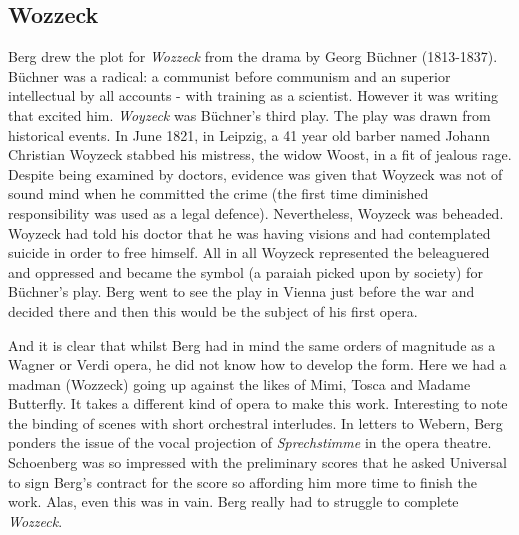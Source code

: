\subsection{Wozzeck}
Berg drew the plot for \textit{Wozzeck} from the drama by Georg B\"uchner (1813-1837). B\"uchner was a radical: a communist before communism and an superior intellectual by all accounts - with training as a scientist. However it was writing that excited him. \textit{Woyzeck} was B\"uchner's third play. The play was drawn from historical events. In June 1821, in Leipzig, a 41 year old barber named Johann Christian Woyzeck stabbed his mistress, the widow Woost, in a fit of jealous rage. Despite being examined by doctors, evidence was given that Woyzeck was not of sound mind when he committed the crime (the first time diminished responsibility was used as a legal defence). Nevertheless, Woyzeck was beheaded. Woyzeck had told his doctor that he was having visions and had contemplated suicide in order to free himself. All in all Woyzeck represented the beleaguered and oppressed and became the symbol (a paraiah picked upon by society) for B\"uchner's play. Berg went to see the play in Vienna just before the war and decided there and then this would be the subject of his first opera.

And it is clear that whilst Berg had in mind the same orders of magnitude as a Wagner or Verdi opera, he did not know how to develop the form. Here we had a madman (Wozzeck) going up against the likes of Mimi, Tosca and Madame Butterfly. It takes a different kind of opera to make this work. Interesting to note the binding of scenes with short orchestral interludes. In letters to Webern, Berg ponders the issue of the vocal projection of \textit{Sprechstimme} in the opera theatre. Schoenberg was so impressed with the preliminary scores that he asked Universal to sign Berg's contract for the score so affording him more time to finish the work. Alas, even this was in vain. Berg really had to struggle to complete \textit{Wozzeck}. 

